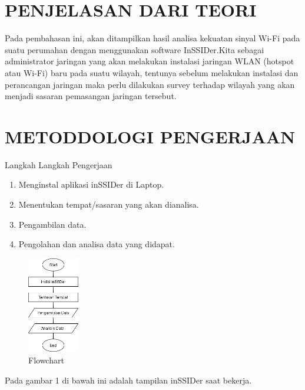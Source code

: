 \documentclass[conference]{IEEEtran}
\begin{document}
\vspace{0.2cm}

\section{PENJELASAN DARI TEORI}

\vspace{0.2cm}

Pada pembahasan ini, akan ditampilkan hasil analisa kekuatan sinyal Wi-Fi pada suatu perumahan dengan menggunakan software InSSIDer.Kita sebagai administrator jaringan yang akan melakukan instalasi jaringan WLAN (hotspot atau Wi-Fi) baru pada suatu wilayah, tentunya sebelum melakukan instalasi dan perancangan jaringan maka perlu dilakukan survey terhadap wilayah yang akan menjadi sasaran pemasangan jaringan tersebut.

\vspace{0.3cm}

\section{METODDOLOGI PENGERJAAN}

\vspace{0.2cm}
Langkah Langkah Pengerjaan
\begin{enumerate}
    \item Menginstal aplikasi inSSIDer di Laptop.
    \item Menentukan tempat/sasaran yang akan dianalisa.
    \item Pengambilan data.
    \item Pengolahan dan analisa data yang didapat.
\end{enumerate}

\begin{figure}[h]
	\centering
	\includegraphics[width=0.2\textwidth]{Flowchart.png}
	\caption{Flowchart}
\end{figure}

\vspace{0.3cm}
Pada gambar 1 di bawah ini adalah tampilan inSSIDer saat bekerja.
\end{document}
